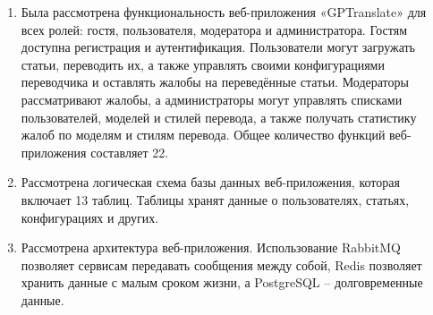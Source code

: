 \begin{enumerate}
    \item Была рассмотрена функциональность веб-приложения «GPTranslate» для всех ролей: гостя, пользователя, модератора и администратора. Гостям доступна регистрация и аутентификация. Пользователи могут загружать статьи, переводить их, а также управлять своими конфигурациями переводчика и оставлять жалобы на переведённые статьи. Модераторы рассматривают жалобы, а администраторы могут управлять списками пользователей, моделей и стилей перевода, а также получать статистику жалоб по моделям и стилям перевода. Общее количество функций веб-приложения составляет 22.
    \item Рассмотрена логическая схема базы данных веб-приложения, которая включает 13 таблиц. Таблицы хранят данные о пользователях, статьях, конфигурациях и других.
    \item Рассмотрена архитектура веб-приложения. Использование RabbitMQ позволяет сервисам передавать сообщения между собой, Redis позволяет хранить данные с малым сроком жизни, а PostgreSQL – долговременные данные.
\end{enumerate}
